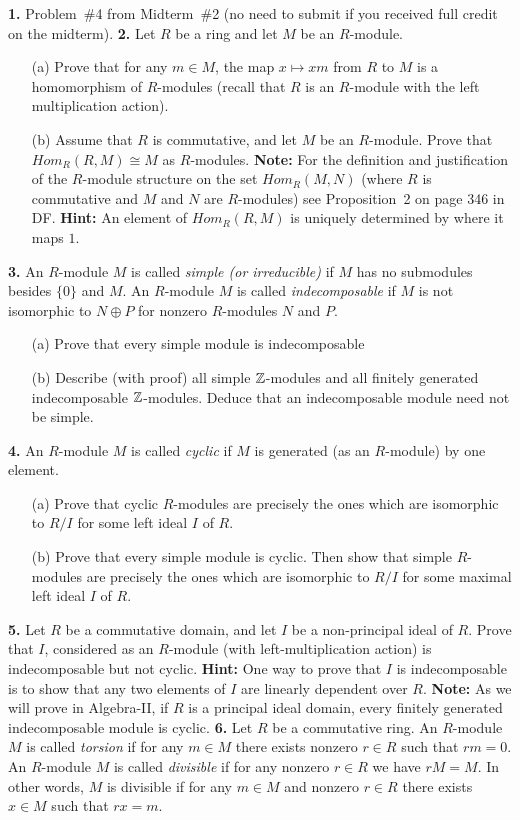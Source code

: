 \documentclass[12pt]{amsart}
\begin{document}
{\bf 1.} Problem~\#4 from Midterm~\#2 (no need to submit if you received full credit on the midterm).
\skv
{\bf 2.} Let $R$ be a ring and let $M$ be an $R$-module.
\begin{itemize}
\item[(a)] Prove that for any $m\in M$, the map $x\mapsto xm$ from $R$ to $M$ is a homomorphism of $R$-modules
(recall that $R$ is an $R$-module with the left multiplication action).
\item[(b)] Assume that $R$ is commutative, and let $M$ be an $R$-module. Prove that $Hom_R(R,M)\cong M$ as $R$-modules. {\bf Note:} For the definition and justification
of the $R$-module structure on the set $Hom_R(M,N)$ (where $R$ is commutative and $M$ and $N$ are $R$-modules) see Proposition~2 on page 346 in DF. {\bf Hint:}
An element of $Hom_R(R,M)$ is uniquely determined by where it maps $1$.
\end{itemize}
\skv
{\bf 3.} An $R$-module $M$ is called {\it simple (or irreducible)} if
$M$ has no submodules besides $\{0\}$ and $M$. An $R$-module $M$ is called
{\it indecomposable} if $M$ is not isomorphic to $N\oplus P$ for nonzero
$R$-modules $N$ and $P$.
\begin{itemize}
\item[(a)] Prove that every simple module is indecomposable
\item[(b)] Describe (with proof) all simple ${\mathbb Z}$-modules and all finitely generated
indecomposable ${\mathbb Z}$-modules. Deduce that an indecomposable module need not
be simple.
\end{itemize}
\skv
{\bf 4.} An $R$-module $M$ is called {\it cyclic} if $M$ is generated
(as an $R$-module) by one element.
\begin{itemize}
\item[(a)] Prove that cyclic $R$-modules are precisely the ones which are isomorphic to $R/I$
for some left ideal $I$ of $R$.
\item[(b)] Prove that every simple module is cyclic. Then show that simple
$R$-modules are precisely the ones which are isomorphic to $R/I$
for some maximal left ideal $I$ of $R$.
\end{itemize}
\skv
{\bf 5.} Let $R$ be a commutative domain, and let $I$ be a non-principal ideal of $R$. 
Prove that $I$, considered as an $R$-module (with left-multiplication action) is indecomposable but not cyclic. 
{\bf Hint:} One way to prove that $I$ is indecomposable is to show that any two elements of $I$ 
are linearly dependent over $R$. {\bf Note:} As we will prove in Algebra-II, if $R$ is a principal
ideal domain, every finitely generated indecomposable module is cyclic.
\skv
{\bf 6.} Let $R$ be a commutative ring.
An $R$-module $M$ is called {\it torsion} if for any $m\in M$
there exists nonzero $r\in R$ such that $rm=0$. An $R$-module $M$ is called {\it divisible} 
if for any nonzero $r\in R$ we have $rM=M$. In other words, $M$ is divisible if
for any $m\in M$ and nonzero $r\in R$ there exists $x\in M$ such that $rx=m$.
\end{document}
